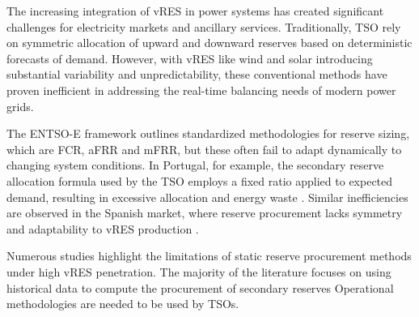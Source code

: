 The increasing integration of \gls{vRES} in power systems has created significant challenges for electricity markets and ancillary services. Traditionally, \gls{TSO} rely on symmetric allocation of upward and downward reserves based on deterministic forecasts of demand. However, with \gls{vRES} like wind and solar introducing substantial variability and unpredictability, these conventional methods have proven inefficient in addressing the real-time balancing needs of modern power grids.\par
The \gls{ENTSO-E} framework \cite{handbook2009policy} outlines standardized methodologies for reserve sizing, which are \gls{FCR}, \gls{aFRR} and \gls{mFRR}, but these often fail to adapt dynamically to changing system conditions. In Portugal, for example, the secondary reserve allocation formula used by the \gls{TSO} employs a fixed ratio applied to expected demand, resulting in excessive allocation and energy waste \cite{Frade:19c,Perissi2022}. Similar inefficiencies are observed in the Spanish market, where reserve procurement lacks symmetry and adaptability to \gls{vRES} production \cite{Algarvio:24,Cardo-Miota:23}.\par %
%
Numerous studies highlight the limitations of static reserve procurement methods under high vRES penetration.
%
The majority of the literature focuses on using historical data to compute the procurement of secondary reserves \cite{Knorr:19,Frade2019_market,Papavasiliou:21}
%
Operational methodologies are needed to be used by TSOs.

